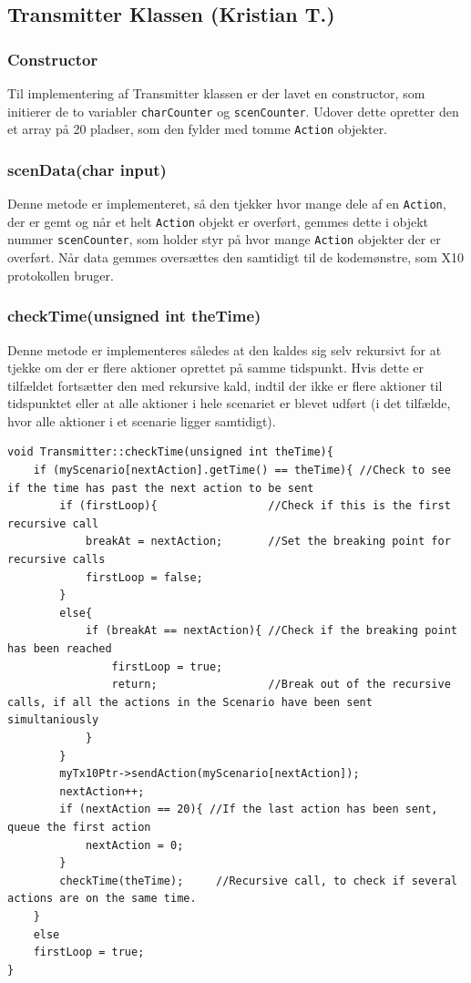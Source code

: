 \subsection{Transmitter Klassen (Kristian T.)}

\subsubsection{Constructor}
Til implementering af Transmitter klassen er der lavet en constructor, som initierer de to variabler \texttt{charCounter} og \texttt{scenCounter}. Udover dette opretter den et array på 20 pladser, som den fylder med tomme \texttt{Action} objekter.

\subsubsection{scenData(char input)}
Denne metode er implementeret, så den tjekker hvor mange dele af en \texttt{Action}, der er gemt og når et helt \texttt{Action} objekt er overført, gemmes dette i objekt nummer \texttt{scenCounter}, som holder styr på hvor mange \texttt{Action} objekter der er overført. Når data gemmes oversættes den samtidigt til de kodemønstre, som X10 protokollen bruger.

\subsubsection{checkTime(unsigned int theTime)}
Denne metode er implementeres således at den kaldes sig selv rekursivt for at tjekke om der er flere aktioner oprettet på samme tidspunkt. Hvis dette er tilfældet fortsætter den med rekursive kald, indtil der ikke er flere aktioner til tidspunktet eller at alle aktioner i hele scenariet er blevet udført (i det tilfælde, hvor alle aktioner i et scenarie ligger samtidigt).

\begin{lstlisting}
void Transmitter::checkTime(unsigned int theTime){
	if (myScenario[nextAction].getTime() == theTime){ //Check to see if the time has past the next action to be sent
		if (firstLoop){					//Check if this is the first recursive call
			breakAt = nextAction;		//Set the breaking point for recursive calls
			firstLoop = false;
		}
		else{
			if (breakAt == nextAction){	//Check if the breaking point has been reached
				firstLoop = true;
				return;					//Break out of the recursive calls, if all the actions in the Scenario have been sent simultaniously
			}
		}
		myTx10Ptr->sendAction(myScenario[nextAction]);
		nextAction++;
		if (nextAction == 20){ //If the last action has been sent, queue the first action
			nextAction = 0;
		}
		checkTime(theTime);		//Recursive call, to check if several actions are on the same time.
	}
	else
	firstLoop = true;
}
\end{lstlisting}

